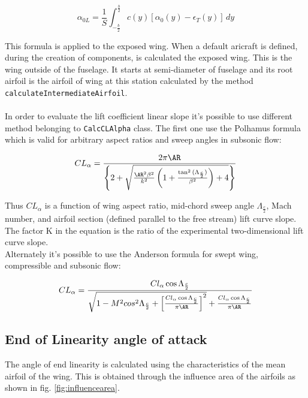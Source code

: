 \begin{equation}
\alpha_{0L} = \frac{1}{S}\int_{-\frac{b}{2}}^{\frac{b}{2}} c(y) [ \alpha_0(y) - \epsilon_T(y) ] \, dy
\end{equation}

This formula  is applied to the exposed wing. When a default aricraft is defined, during the creation of components, is calculated the exposed wing. This is the wing outside of the fuselage. It starts at semi-diameter of fuselage and its root airfoil is the airfoil of wing  at this station calculated by the method \texttt{calculateIntermediateAirfoil}.\\ \\

In order to evaluate the lift coefficient linear slope  it's possible to use different method belonging to \texttt{CalcCLAlpha} class. The first one use the Polhamus formula which is valid for arbitrary aspect ratios and sweep angles in subsonic flow:

\begin{equation}
CL_{\alpha} = \frac{2 \pi \AR}{ \left\{ 2 + \sqrt{\frac{\AR^2 \beta^2}{k^2} \left ( 1 + \frac{\tan^2{(\Lambda_{\frac{c}{2}})}}{\beta^2} \right) + 4 }\right\}}
\end{equation}

Thus $CL_{\alpha}$  is a function of wing aspect ratio, mid-chord sweep angle $\Lambda_{\frac{c}{2}}$, Mach number, and airfoil section (defined parallel to the free stream) lift curve slope. The factor K in the equation is the ratio of the experimental two-dimensional lift curve slope.\\
Alternately it's possible to use the Anderson formula for swept wing, compressible and subsonic flow:

\begin{equation}
CL_{\alpha} = 
\frac{Cl_{\alpha} \cos{\Lambda_{\frac{c}{2}}}}
{\sqrt{1 - M^2  cos^2 {\Lambda_{\frac{c}{2}}}
 + \left[ \frac{Cl_{\alpha} \cos{\Lambda_{\frac{c}{2}}}}{\pi \AR}\right]^2} + \frac{Cl_{\alpha} \cos{\Lambda_{\frac{c}{2}}}}{\pi \AR}}
\end{equation}



\subsection{End of Linearity angle of attack}

The angle of end linearity is calculated using the characteristics of the mean airfoil of the wing. This is obtained through the influence area of the airfoils as shown in fig. \ref{fig:influencearea}.



